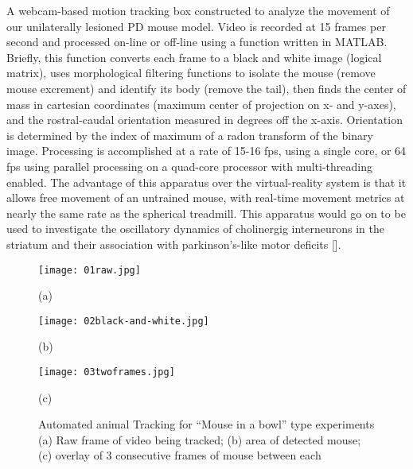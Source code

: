 \documentclass[../main.tex]{subfiles}
\begin{document}
A webcam-based motion tracking box constructed to analyze the movement of our unilaterally lesioned PD mouse model.
Video is recorded at 15 frames per second and processed on-line or off-line using a function written in MATLAB.
Briefly, this function converts each frame to a black and white image (logical matrix), uses morphological filtering functions to isolate the mouse (remove mouse excrement) and identify its body (remove the tail), then finds the center of mass in cartesian coordinates (maximum center of projection on x- and y-axes), and the rostral-caudal orientation measured in degrees off the x-axis.
Orientation is determined by the index of maximum of a radon transform of the binary image.
Processing is accomplished at a rate of 15-16 fps, using a single core, or 64 fps using parallel processing on a quad-core processor with multi-threading enabled.
The advantage of this apparatus over the virtual-reality system is that it allows free movement of an untrained mouse, with real-time movement metrics at nearly the same rate as the spherical treadmill.
This apparatus would go on to be used to investigate the oscillatory dynamics of cholinergig interneurons in the striatum and their association with parkinson's-like motor deficits [\cite{Kondabolu_2016}].

\begin{figure}[htb]
	\begin{minipage}[t]{0.32\linewidth}\centering
		\texttt{[image: 01raw.jpg]}
		\centerline{(a)}
	\end{minipage}
	\hfill
	\begin{minipage}[t]{0.32\linewidth}\centering
		\texttt{[image: 02black-and-white.jpg]}
		\centerline{(b)}
	\end{minipage}
	\begin{minipage}[t]{0.32\linewidth}\centering
		\texttt{[image: 03twoframes.jpg]}
		\centerline{(c)}
	\end{minipage}
	\caption{
		Automated animal Tracking for ``Mouse in a bowl'' type experiments (a) Raw frame of video being tracked;
		(b) area of detected mouse; (c) overlay of 3 consecutive frames of mouse between each}
	\label{fig:Sampling}
\end{figure}
\end{document}
